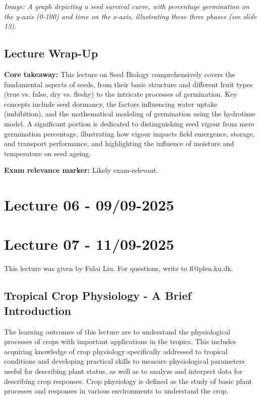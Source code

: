 \textit{Image: A graph depicting a seed survival curve, with percentage germination on the y-axis (0-100) and time on the x-axis, illustrating these three phases (see slide 13).}


\subsection*{Lecture Wrap-Up} 
\textbf{Core takeaway:} This lecture on Seed Biology comprehensively covers the fundamental aspects of seeds, from their basic structure and different fruit types (true vs. false, dry vs. fleshy) to the intricate processes of germination. Key concepts include seed dormancy, the factors influencing water uptake (imbibition), and the mathematical modeling of germination using the hydrotime model. A significant portion is dedicated to distinguishing seed vigour from mere germination percentage, illustrating how vigour impacts field emergence, storage, and transport performance, and highlighting the influence of moisture and temperature on seed ageing. 

\vspace{1em} 
\textbf{Exam relevance marker:} Likely exam-relevant.

\section{Lecture 06 - 09/09-2025}

\section{Lecture 07 - 11/09-2025}
This lecture was given by Fulai Liu. For questions, write to fl@plen.ku.dk.

\subsection{Tropical Crop Physiology - A Brief Introduction} 
The learning outcomes of this lecture are to understand the physiological processes of crops with important applications in the tropics. This includes acquiring knowledge of crop physiology specifically addressed to tropical conditions and developing practical skills to measure physiological parameters useful for describing plant status, as well as to analyze and interpret data for describing crop responses.
Crop physiology is defined as the study of basic plant processes and responses in various environments to understand the crop.


